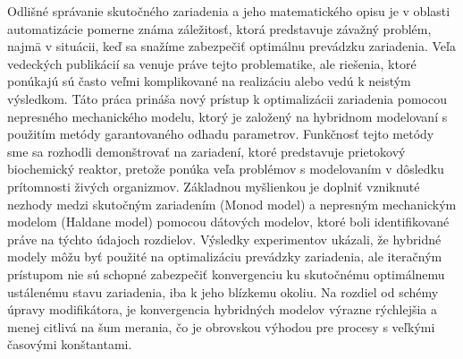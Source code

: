 
Odlišné správanie skutočného zariadenia a jeho matematického opisu je v oblasti automatizácie pomerne známa záležitosť, ktorá predstavuje závažný problém, najmä v situácii, keď sa snažíme zabezpečiť optimálnu prevádzku zariadenia. Veľa vedeckých publikácií sa venuje práve tejto problematike, ale riešenia, ktoré ponúkajú sú často veľmi komplikované na realizáciu alebo vedú k neistým výsledkom.
Táto práca prináša nový prístup k optimalizácii zariadenia pomocou nepresného
mechanického modelu, ktorý je založený na hybridnom modelovaní s použitím metódy garantovaného odhadu parametrov. Funkčnosť tejto metódy sme sa rozhodli demonštrovať na zariadení, ktoré predstavuje prietokový biochemický reaktor, pretože ponúka veľa problémov s modelovaním v dôsledku prítomnosti živých organizmov.
Základnou myšlienkou je doplniť vzniknuté nezhody medzi skutočným zariadením (Monod model) a nepresným mechanickým modelom (Haldane model) pomocou dátových modelov, ktoré boli identifikované práve na týchto údajoch rozdielov.
Výsledky experimentov ukázali, že hybridné modely môžu byť použité na optimalizáciu prevádzky zariadenia, ale iteračným prístupom
nie sú schopné zabezpečiť konvergenciu ku skutočnému optimálnemu ustálenému stavu zariadenia, iba k jeho blízkemu okoliu. Na rozdiel od schémy
úpravy modifikátora, je konvergencia hybridných modelov výrazne rýchlejšia a menej citlivá na šum merania, čo je obrovskou výhodou pre procesy s veľkými časovými konštantami.
